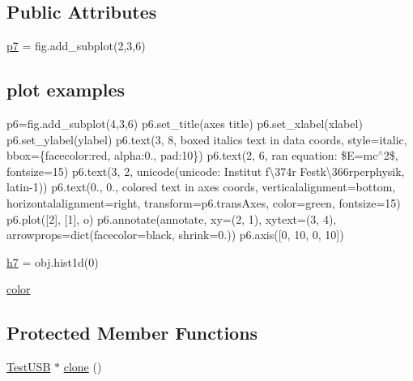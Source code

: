 \subsection*{Public Attributes}
\begin{DoxyCompactItemize}
\item 
\hyperlink{classTestUSB_a5d9d8c12d838c12bcbd809011e07982f}{p7} = fig.\+add\+\_\+subplot(2,3,6)
\begin{DoxyCompactList}\small\item\em \subsection*{plot examples}

p6=fig.\+add\+\_\+subplot(4,3,6) p6.\+set\+\_\+title(\textquotesingle{}axes title\textquotesingle{}) p6.\+set\+\_\+xlabel(\textquotesingle{}xlabel\textquotesingle{}) p6.\+set\+\_\+ylabel(\textquotesingle{}ylabel\textquotesingle{}) p6.\+text(3, 8, \textquotesingle{}boxed italics text in data coords\textquotesingle{}, style=\textquotesingle{}italic\textquotesingle{}, bbox=\{\textquotesingle{}facecolor\textquotesingle{}\+:\textquotesingle{}red\textquotesingle{}, \textquotesingle{}alpha\textquotesingle{}\+:0., \textquotesingle{}pad\textquotesingle{}\+:10\}) p6.\+text(2, 6, r\textquotesingle{}an equation\+: \$E=mc$^\wedge$2\$\textquotesingle{}, fontsize=15) p6.\+text(3, 2, unicode(\textquotesingle{}unicode\+: Institut f\textbackslash{}374r Festk\textbackslash{}366rperphysik\textquotesingle{}, \textquotesingle{}latin-\/1\textquotesingle{})) p6.\+text(0., 0., \textquotesingle{}colored text in axes coords\textquotesingle{}, verticalalignment=\textquotesingle{}bottom\textquotesingle{}, horizontalalignment=\textquotesingle{}right\textquotesingle{}, transform=p6.\+trans\+Axes, color=\textquotesingle{}green\textquotesingle{}, fontsize=15) p6.\+plot(\mbox{[}2\mbox{]}, \mbox{[}1\mbox{]}, \textquotesingle{}o\textquotesingle{}) p6.\+annotate(\textquotesingle{}annotate\textquotesingle{}, xy=(2, 1), xytext=(3, 4), arrowprops=dict(facecolor=\textquotesingle{}black\textquotesingle{}, shrink=0.)) p6.\+axis(\mbox{[}0, 10, 0, 10\mbox{]}) \end{DoxyCompactList}\item 
\hyperlink{classTestUSB_a18ac9c994c85be08fa09d6b3b1cb4446}{h7} = obj.\+hist1d(0)
\item 
\hyperlink{classTestUSB_a91e2b4e7057340ff77a799f16730a8fd}{color}
\end{DoxyCompactItemize}
\subsection*{Protected Member Functions}
\begin{DoxyCompactItemize}
\item 
\hyperlink{classTestUSB_1_1TestUSB}{Test\+U\+SB} $\ast$ \hyperlink{classTestUSB_a109094c177ccaaa224b514c118c93ce7}{clone} ()
\end{DoxyCompactItemize}

